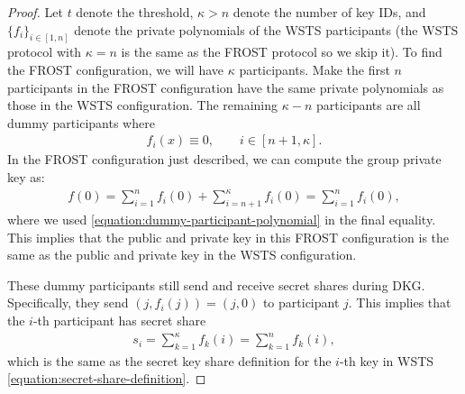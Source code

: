 \documentclass{article}
\theoremstyle{definition}
\theoremstyle{remark}
\begin{document}
\begin{proof} 
Let $t$ denote the threshold, $\kappa > n$ denote the number of key IDs, and $\{ f_i \}_{i\in [1,n]}$ denote the private polynomials of the WSTS participants (the WSTS protocol with $\kappa = n$ is the same as the FROST protocol so we skip it). To find the FROST configuration, we will have $\kappa$ participants. Make the first $n$ participants in the FROST configuration have the same private polynomials as those in the WSTS configuration. The remaining $\kappa - n$ participants are all dummy participants where
\begin{align}\label{equation:dummy-participant-polynomial}
    f_i(x) \equiv 0, \qquad i \in [n+1, \kappa].
\end{align}
In the FROST configuration just described, we can compute the group private key as:
\begin{align}
    f(0) = \sum_{i=1}^n f_i(0) + \sum_{i = n+1}^\kappa f_i(0) = \sum_{i=1}^n f_i(0),
\end{align}
where we used \eqref{equation:dummy-participant-polynomial} in the final equality. This implies that the public and private key in this FROST configuration is the same as the public and private key in the WSTS configuration.

These dummy participants still send and receive secret shares during DKG. Specifically, they send $(j, f_i(j)) = (j, 0)$ to participant $j$. This implies that the $i$-th participant has secret share
\begin{align}
    s_i = \sum_{k=1}^\kappa f_k(i) = \sum_{k=1}^n f_k(i),
\end{align}
which is the same as the secret key share definition for the $i$-th key in WSTS \eqref{equation:secret-share-definition}.


\end{proof}
\end{document}

